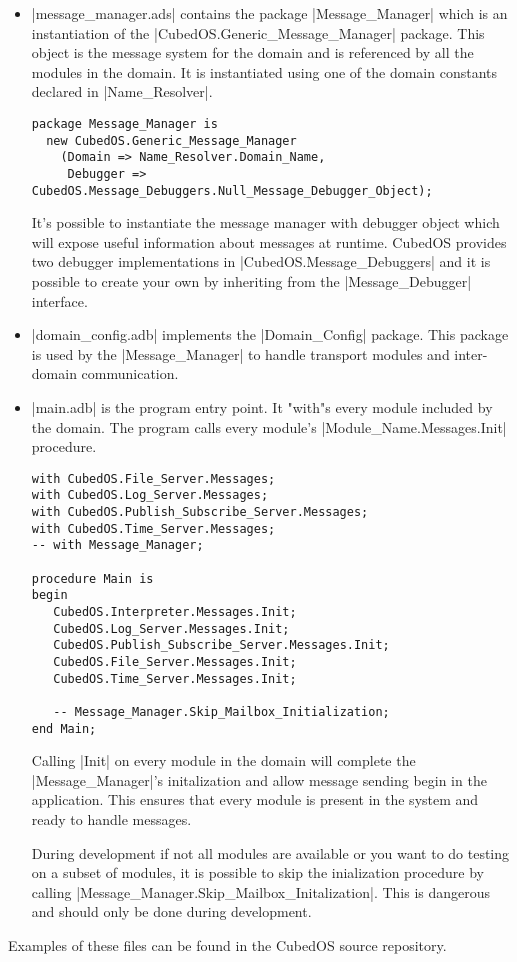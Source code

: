\begin{itemize}
\item |message_manager.ads| contains the package |Message_Manager| which is an instantiation of the |CubedOS.Generic_Message_Manager| package. This object is the message system for the domain and is referenced by all the modules in the domain. It is instantiated using one of the domain constants declared in |Name_Resolver|.

\begin{verbatim}
package Message_Manager is
  new CubedOS.Generic_Message_Manager
    (Domain => Name_Resolver.Domain_Name,
     Debugger => CubedOS.Message_Debuggers.Null_Message_Debugger_Object);
\end{verbatim}

It's possible to instantiate the message manager with debugger object which will expose useful information about messages at runtime. CubedOS provides two debugger implementations in |CubedOS.Message_Debuggers| and it is possible to create your own by inheriting from the |Message_Debugger| interface.

\item |domain_config.adb| implements the |Domain_Config| package. This package is used by the |Message_Manager| to handle transport modules and inter-domain communication.

\item |main.adb| is the program entry point. It "with"s every module included by the domain. The program calls every module's |Module_Name.Messages.Init| procedure.

\begin{verbatim}
with CubedOS.File_Server.Messages;
with CubedOS.Log_Server.Messages;
with CubedOS.Publish_Subscribe_Server.Messages;
with CubedOS.Time_Server.Messages;
-- with Message_Manager;

procedure Main is
begin
   CubedOS.Interpreter.Messages.Init;
   CubedOS.Log_Server.Messages.Init;
   CubedOS.Publish_Subscribe_Server.Messages.Init;
   CubedOS.File_Server.Messages.Init;
   CubedOS.Time_Server.Messages.Init;

   -- Message_Manager.Skip_Mailbox_Initialization;
end Main;
\end{verbatim}

Calling |Init| on every module in the domain will complete the |Message_Manager|'s initalization and allow message sending begin in the application. This ensures that every module is present in the system and ready to handle messages.

During development if not all modules are available or you want to do testing on a subset of modules, it is possible to skip the inialization procedure by calling |Message_Manager.Skip_Mailbox_Initalization|. This is dangerous and should only be done during development.
\end{itemize}

Examples of these files can be found in the CubedOS source repository.

